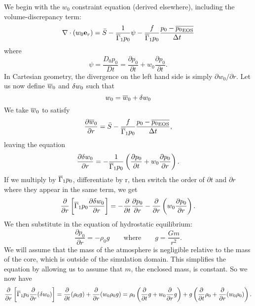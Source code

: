 We begin with the $w_0$ constraint equation (derived elsewhere), including the volume-discrepancy term:
\begin{equation}
\nabla \cdot  ({w_0 \mathbf{e}_r}) = \bar{S} - \frac{1}{\overline{\Gamma}_1 p_0} \psi - \frac{f}{\overline{\Gamma}_1 p_0} \frac{p_0 - \overline{{p_0}_\mathrm{EOS}}}{\Delta t}
\end{equation}
where
\[ \psi = \frac{D_0 p_0}{D t} = \frac{\partial p_0}{\partial t} + w_0 \frac{\partial p_0}{\partial t}. \]
In Cartesian geometry, the divergence on the left hand side is simply $\partial
w_0 / \partial r$.
Let us now define $\overline{w}_0$ and $\delta w_0$ such that
\[ w_0 = \overline{w}_0 + \delta w_0 \]
We take $\overline{w}_0$ to satisfy
\begin{equation}
\frac{\partial \overline{w}_0}{\partial r} = \bar{S} - \frac{f}{\overline{\Gamma}_1 p_0} \frac{p_0 - \overline{{p_0}_\mathrm{EOS}}}{\Delta t} ,
\end{equation}
leaving the equation
\begin{equation}
\frac{\partial \delta w_0}{\partial r} = - \frac{1}{\overline{\Gamma}_1 p_0} \left ({ \frac{\partial p_0}{\partial t} + w_0 \frac{\partial p_0}{\partial r}} \right ).
\end{equation}
%
If we multiply by $\overline{\Gamma}_1 p_0$, differentiate by r, then switch the order of $\partial
t$ and $\partial r$ where they appear in the same term, we get
\begin{equation}
\frac{\partial}{\partial r} \left[ \overline{\Gamma}_1 p_0 \frac{\partial \delta w_0}{\partial r} \right] =
   - \frac{\partial}{\partial t} \frac{\partial p_0}{\partial r} -  \frac{\partial}{\partial r} \left (w_0 \frac{\partial p_0}{\partial r} \right) .
\end{equation}
%
We then substitute in the equation of hydrostatic equilibrium:
\[ \frac{\partial p_0}{\partial r} = -\rho_0 g \quad\quad \mbox{where} \quad\quad
   g = \frac{G m}{r^2}. \]
We will assume that the mass of the atmosphere is negligible relative to the
mass of the core, which is outside of the simulation domain.  This simplifies
the equation by allowing us to assume that $m$, the enclosed mass, is constant.
So we now have
\begin{equation}
\frac{\partial}{\partial r} \left[ \overline{\Gamma}_1 p_0 \frac{\partial}{\partial r}{({\delta w_0})} \right]
   = \frac{\partial}{\partial t}{({\rho_0 g}}) + \frac{\partial}{\partial r}{({w_0 \rho_0 g})}
   = \rho_0 \left ({\frac{\partial}{\partial t}{g} + w_0 \frac{\partial}{\partial r}{g}} \right )
         + g \left ({\frac{\partial}{\partial t}{\rho_0} + \frac{\partial}{\partial r}{({w_0 \rho_0})}} \right ).
\end{equation}

